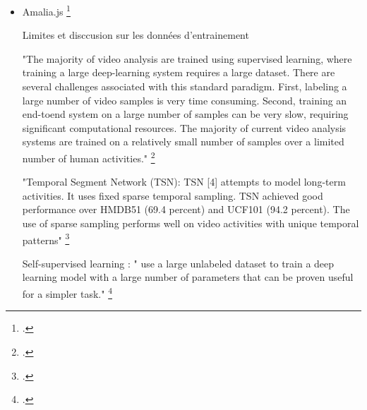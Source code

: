 \begin{itemize}
Diginpix repose sur : "The identification process mainly relies
on an efficient CBIR system, searching in an indexed image
database composed of 600,000 weak-labelled images crawled
from Google Images. DigInPix proposes a responsive-design
html5 interface1 for testing purposes."\footcite{letessier2015}

fonctionnement détaillé : "The core engine makes use of
local descriptors hashing techniques and a scalable indexing and search structure based on hash tables. This allows matching all local descriptors one by one in the full index and favors a more precise matching of small objects in highly cluttered pictures. Using geometry in addition to this raw scheme further improves the search performances" \footcite{letessier2015}

Diginpix produti une sorte de segmentation : "When dealing with videos, keyframes are first extracted whenever the content changes significantly, i.e. new shot, moving camera, new objects appearing, etc., thanks to a keyframe detector using grid-based histograms of LBP features. The time between two keyframes typically varies from 100ms to
30s. All the detected keyframes are then processed one by one in the same way than single images."\footcite{letessier2015}

\item Amalia.js
\footcite{herve2015}


Limites et disccusion sur les données d'entrainement 

"The majority of video analysis are trained using supervised learning, where training a large deep-learning system requires a
large dataset. There are several challenges associated with this
standard paradigm. First, labeling a large number of video samples is very time consuming. Second, training an end-toend system on a large number of samples can be very slow, requiring significant computational resources. The majority of current video analysis systems are trained on a relatively small number of samples over a limited number
of human activities." \footcite{pattichis2023}

"Temporal Segment Network (TSN): TSN [4] attempts
to model long-term activities. It uses fixed sparse temporal
sampling. TSN achieved good performance over HMDB51
(69.4 percent) and UCF101 (94.2 percent). The use of sparse sampling performs well on video activities with unique temporal patterns" \footcite{pattichis2023}

Self-supervised learning : " use a large unlabeled dataset to train a deep learning model with a large number of parameters that can be proven useful for a simpler task." \footcite{pattichis2023}


\end{itemize}
